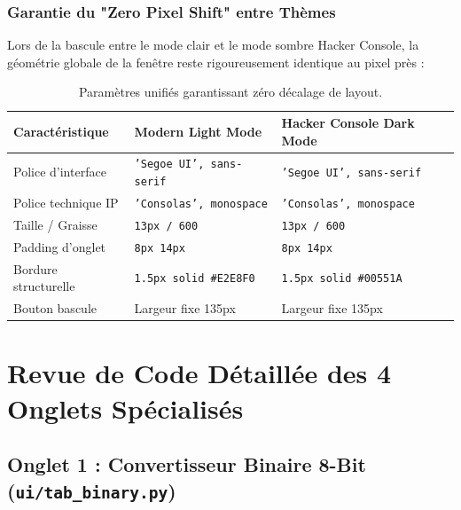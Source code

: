 \documentclass[11pt,a4paper]{report}
\begin{document}
\section{Garantie du "Zero Pixel Shift" entre Th\`emes}
Lors de la bascule entre le mode clair et le mode sombre Hacker Console, la g\'eom\'etrie globale de la fen\^etre reste rigoureusement identique au pixel pr\`es :
\begin{table}[h]
\centering
\begin{tabular}{lll}
\toprule
\textbf{Caract\'eristique} & \textbf{Modern Light Mode} & \textbf{Hacker Console Dark Mode} \\
\midrule
Police d'interface & \texttt{'Segoe UI', sans-serif} & \texttt{'Segoe UI', sans-serif} \\
Police technique IP & \texttt{'Consolas', monospace} & \texttt{'Consolas', monospace} \\
Taille / Graisse & \texttt{13px / 600} & \texttt{13px / 600} \\
Padding d'onglet & \texttt{8px 14px} & \texttt{8px 14px} \\
Bordure structurelle & \texttt{1.5px solid \#E2E8F0} & \texttt{1.5px solid \#00551A} \\
Bouton bascule & Largeur fixe 135px & Largeur fixe 135px \\
\bottomrule
\end{tabular}
\caption{Param\`etres unifi\'es garantissant z\'ero d\'ecalage de layout.}
\end{table}

\part{Revue de Code D\'etaill\'ee des 4 Onglets Sp\'ecialis\'es}

\chapter{Onglet 1 : Convertisseur Binaire 8-Bit (\texttt{ui/tab\_binary.py})}
\end{document}
